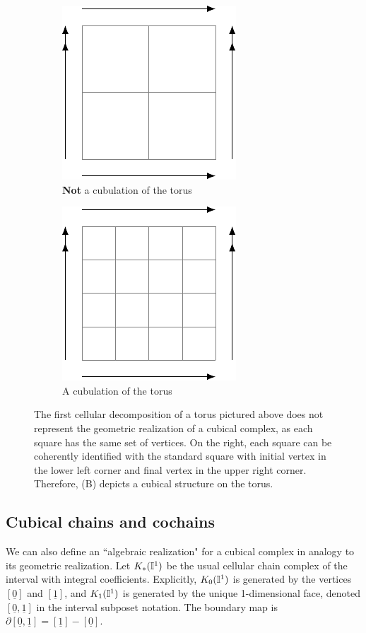 \begin{figure}[h]
	\begin{subfigure}{.4\textwidth}
		\centering
		\includegraphics{figures/torus1.pdf}
		\caption{\textbf{Not} a cubulation of the torus}
	\end{subfigure}\qquad
	\begin{subfigure}{.4\textwidth}
		\centering
		\includegraphics{figures/torus2.pdf}
		\caption{A cubulation of the torus}
	\end{subfigure}
	\caption{The first cellular decomposition of a torus pictured above does not represent the geometric realization of a cubical complex, as each square has the same set of vertices. On the right, each square can be coherently identified with the standard square with initial vertex in the lower left corner and final vertex in the upper right corner. Therefore, (B) depicts a cubical structure on the torus.}
	\label{F: cubical structure}
\end{figure}


\subsection{Cubical chains and cochains} \label{S: cubical cochains}

We can also define an ``algebraic realization" for a cubical complex in analogy to its geometric realization.
Let $K_*(\mathbb{I}^1)$ be the usual cellular chain complex of the interval with integral coefficients.
Explicitly, $K_0(\mathbb{I}^1)$ is generated by the vertices $[\underline{0}]$ and $[\underline{1}]$, and $K_1(\mathbb{I}^1)$ is generated by the unique 1-dimensional face, denoted $[\underline{0},\underline{1}]$ in the interval subposet notation. The boundary map is $\partial [\underline{0},\underline{1}]=[\underline{1}]-[\underline{0}]$.

